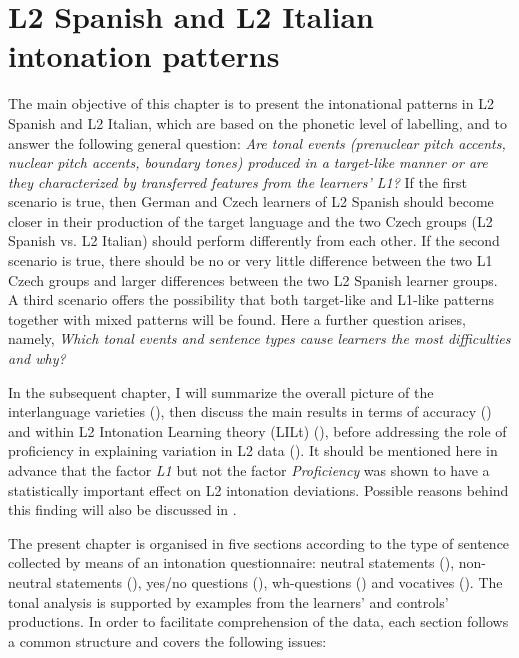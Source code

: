
\chapter{L2 Spanish and L2 Italian intonation patterns}\label{ch:4}

The main objective of this chapter is to present the intonational patterns in L2 Spanish and L2 Italian, which are based on the phonetic level of labelling, and to answer the following general question: \textit{Are tonal events (prenuclear pitch accents, nuclear pitch accents, boundary tones) produced in a target-like manner or are they characterized by transferred features from the learners’ L1?} If the first scenario is true, then German and Czech learners of L2 Spanish should become closer in their production of the target language and the two Czech groups (L2 Spanish vs. L2 Italian) should perform differently from each other. If the second scenario is true, there should be no or very little difference between the two L1 Czech groups and larger differences between the two L2 Spanish learner groups. A third scenario offers the possibility that both target-like and L1-like patterns together with mixed patterns will be found. Here a further question arises, namely, \textit{Which tonal events and sentence types cause learners the most difficulties and why?}



In the subsequent chapter, I will summarize the overall picture of the interlanguage varieties (), then discuss the main results in terms of accuracy () and within  L2 Intonation Learning theory (LILt) (), before addressing the role of proficiency in explaining variation in L2 data (). It should be mentioned here in advance that the factor \textit{L1} but not the factor \textit{Proficiency} was shown to have a statistically important effect on L2 intonation deviations. Possible reasons behind this finding will also be discussed in .



The present chapter is organised in five sections according to the type of sentence collected by means of an intonation questionnaire: neutral statements (), non-neutral statements (), yes/no questions (), wh-questions () and vocatives (). The tonal analysis is supported by examples from the learners’ and controls’ productions. In order to facilitate comprehension of the data, each section follows a common structure and covers the following issues:

